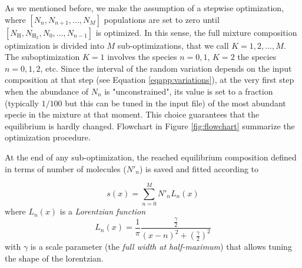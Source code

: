 \documentclass[a4paper, 11pt, twoside]{book}
\begin{document}

As we mentioned before, we make the assumption of a stepwise optimization, where $[N_n, N_{n+1}, ..., N_{M}]$ populations are set to zero until $[N_{\text{H}}, N_{\text{H}_2}, N_0, ..., N_{n-1}]$ is optimized. In this sense, the full mixture composition optimization is divided into $M$ sub-optimizations, that we call $K=1, 2, ..., M$. The suboptimization $K=1$ involves the species $n=0,1$, $K=2$ the species $n=0,1,2$, etc. Since the interval of the random variation depends on the input composition at that step (see Equation \eqref{eqapp:variations}), at the very first step when the abundance of $N_n$ is "unconstrained", its value is set to a fraction (typically $1/100$ but this can be tuned in the input file) of the most abundant specie in the mixture at that moment. This choice guarantees that the equilibrium is hardly changed. Flowchart in Figure \ref{fig:flowchart} summarize the optimization procedure.

At the end of any sub-optimization, the reached equilibrium composition defined in terms of number of molecules ($N'_n$) is saved and fitted according to

\begin{equation}
    s(x)=\sum_{n=0}^{M} N'_n L_n(x) \nonumber 
\end{equation}
where $L_n(x)$ is a \emph{Lorentzian function}
\begin{equation}
    L_n(x) = \frac{1}{\pi}\frac{\frac{\gamma}{2}}{(x-n)^2+(\frac{\gamma}{2})^2} \nonumber
\end{equation}
with $\gamma$ is a scale parameter (the \emph{full width at half-maximum}) that allows tuning the shape of the lorentzian. 
\end{document}

